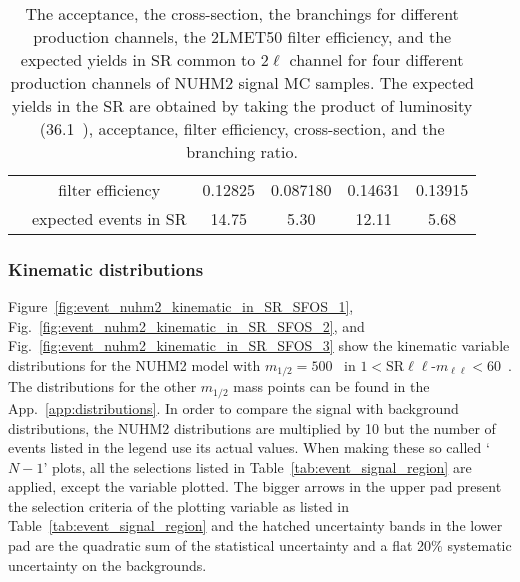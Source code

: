 \begin{table}[htbp]
\begin{center}
{\begin{tabular}{cccccc}
                                         & filter efficiency     & 0.12825                                    & 0.087180                                       & 0.14631                                    & 0.13915\\
                                         & expected events in SR & 14.75                                      & 5.30                                           & 12.11                                      & 5.68\\
                \hline
                \hline
            \end{tabular}
        }
    \end{center}
    \caption{The acceptance, the cross-section, the branchings for different production channels, the 2LMET50 filter efficiency, and the expected yields in SR common to $2\ell$ channel for four different production channels of NUHM2 signal MC samples.
    The expected yields in the SR are obtained by taking the product of luminosity (36.1~\ifb), acceptance, filter efficiency, cross-section, and the branching ratio.}
    \label{tab:event_nuhm2_truth3}
\end{table}%


\subsubsection{Kinematic distributions}
\label{subsubsec:event_kinematic_distributions}
Figure~\ref{fig:event_nuhm2_kinematic_in_SR_SFOS_1}, Fig.~\ref{fig:event_nuhm2_kinematic_in_SR_SFOS_2}, and Fig.~\ref{fig:event_nuhm2_kinematic_in_SR_SFOS_3} show the kinematic variable distributions for the NUHM2 model with $m_{1/2} = 500$~{\GeV} in $1 < \mathrm{SR}\ell \ell$-$m_{\ell \ell} < 60$~{\GeV}.
The distributions for the other $m_{1/2}$ mass points can be found in the App.~\ref{app:distributions}.
In order to compare the signal with background distributions, the NUHM2 distributions are multiplied by 10 but the number of events listed in the legend use its actual values.
When making these so called `$N-1$' plots, all the selections listed in Table~\ref{tab:event_signal_region} are applied, except the variable plotted.
The bigger arrows in the upper pad present the selection criteria of the plotting variable as listed in Table~\ref{tab:event_signal_region} and the hatched uncertainty bands in the lower pad are the quadratic sum of the statistical uncertainty and a flat 20\% systematic uncertainty on the backgrounds.

